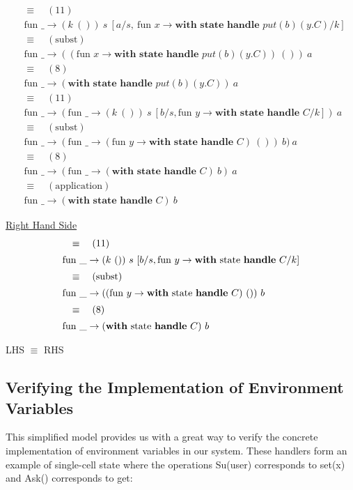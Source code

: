 \documentclass[logo,bsc,singlespacing,parskip]{infthesis}
\begin{document}
\begin{align*}
&\equiv\quad (11) \\
&\text{fun } \_ \rightarrow (k\ ())\ s\ [a/s,\ \text{fun } x \rightarrow \textbf{with state handle } put(b)(y.C)/k] \\
&\equiv\quad (\text{subst}) \\
&\text{fun } \_ \rightarrow ((\text{fun } x \rightarrow \textbf{with state handle } put(b)(y.C))\ ())\ a \\
&\equiv\quad (8) \\
&\text{fun } \_ \rightarrow (\textbf{with state handle } put(b)(y.C))\ a \\
&\equiv\quad (11) \\
&\text{fun } \_ \rightarrow (\text{fun } \_ \rightarrow (k\ ())\ s\ [b/s, \text{fun } y \rightarrow \textbf{with state handle } C/k])\ a \\
&\equiv\quad (\text{subst}) \\
&\text{fun } \_ \rightarrow (\text{fun } \_ \rightarrow (\text{fun } y \rightarrow \textbf{with state handle } C)\ ())\ b)\ a \\
&\equiv\quad (8) \\
&\text{fun } \_ \rightarrow (\text{fun } \_ \rightarrow (\textbf{with state handle } C)\ b)\ a \\
&\equiv\quad (\text{application}) \\
&\text{fun } \_ \rightarrow (\textbf{with state handle } C)\ b
\end{align*}


\underline{Right Hand Side}
\[ 
\begin{array}{l}
\quad\equiv\quad (11) \\[5pt]
\text{fun }\_ \rightarrow (k\ ())\ s\ [b/s, \text{fun } y \rightarrow \text{\textbf{with} state \textbf{handle} } C/k] \\[5pt]
\quad\equiv\quad (\text{subst}) \\[5pt]
\text{fun }\_ \rightarrow ((\text{fun } y \rightarrow \text{\textbf{with} state \textbf{handle} } C)\ ())\ b \\[5pt]
\quad\equiv\quad (8) \\[5pt]
\text{fun }\_ \rightarrow (\text{\textbf{with} state \textbf{handle} } C)\ b
\end{array}
\]

LHS $\equiv$ RHS



\subsection{Verifying the Implementation of Environment Variables}
This simplified model provides us with a great way to verify the concrete implementation of environment variables in our system. These handlers form an example of single-cell state where the operations Su(user) corresponds to set(x) and Ask() corresponds to get:
\end{document}
